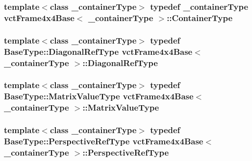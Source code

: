 \subsubsection[{Container\+Type}]{\setlength{\rightskip}{0pt plus 5cm}template$<$class \+\_\+container\+Type$>$ typedef \+\_\+container\+Type {\bf vct\+Frame4x4\+Base}$<$ \+\_\+container\+Type $>$\+::{\bf Container\+Type}}\label{classvct_frame4x4_base_a3ae00d9c053676770458dc28ad41cc5a}
\hypertarget{classvct_frame4x4_base_a838fede6632e0623204c42f3e49bce96}{}
\subsubsection[{Diagonal\+Ref\+Type}]{\setlength{\rightskip}{0pt plus 5cm}template$<$class \+\_\+container\+Type$>$ typedef {\bf Base\+Type\+::\+Diagonal\+Ref\+Type} {\bf vct\+Frame4x4\+Base}$<$ \+\_\+container\+Type $>$\+::{\bf Diagonal\+Ref\+Type}}\label{classvct_frame4x4_base_a838fede6632e0623204c42f3e49bce96}
\hypertarget{classvct_frame4x4_base_a46b60268d306fa5edcfc229da61501ca}{}
\subsubsection[{Matrix\+Value\+Type}]{\setlength{\rightskip}{0pt plus 5cm}template$<$class \+\_\+container\+Type$>$ typedef Base\+Type\+::\+Matrix\+Value\+Type {\bf vct\+Frame4x4\+Base}$<$ \+\_\+container\+Type $>$\+::{\bf Matrix\+Value\+Type}}\label{classvct_frame4x4_base_a46b60268d306fa5edcfc229da61501ca}
\hypertarget{classvct_frame4x4_base_a445582cef7ba9f03553b1d9e63a2d64c}{}
\subsubsection[{Perspective\+Ref\+Type}]{\setlength{\rightskip}{0pt plus 5cm}template$<$class \+\_\+container\+Type$>$ typedef Base\+Type\+::\+Perspective\+Ref\+Type {\bf vct\+Frame4x4\+Base}$<$ \+\_\+container\+Type $>$\+::{\bf Perspective\+Ref\+Type}}\label{classvct_frame4x4_base_a445582cef7ba9f03553b1d9e63a2d64c}
\hypertarget{classvct_frame4x4_base_aee8d584095f21f29903fe8a8b62fb9c6}{}
